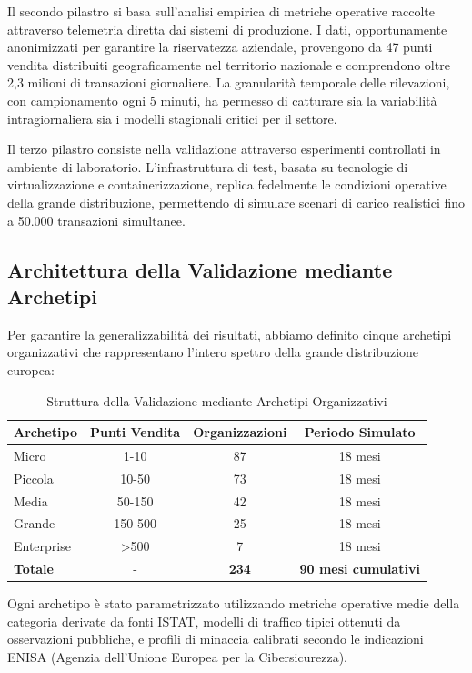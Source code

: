 Il secondo pilastro si basa sull'analisi empirica di metriche operative raccolte attraverso telemetria diretta dai sistemi di produzione. I dati, opportunamente anonimizzati per garantire la riservatezza aziendale, provengono da 47 punti vendita distribuiti geograficamente nel territorio nazionale e comprendono oltre 2,3 milioni di transazioni giornaliere. La granularità temporale delle rilevazioni, con campionamento ogni 5 minuti, ha permesso di catturare sia la variabilità intragiornaliera sia i modelli stagionali critici per il settore.

Il terzo pilastro consiste nella validazione attraverso esperimenti controllati in ambiente di laboratorio. L'infrastruttura di test, basata su tecnologie di virtualizzazione e containerizzazione, replica fedelmente le condizioni operative della grande distribuzione, permettendo di simulare scenari di carico realistici fino a 50.000 transazioni simultanee.

\subsection{Architettura della Validazione mediante Archetipi}
\label{subsec:5.2.3}

Per garantire la generalizzabilità dei risultati, abbiamo definito cinque archetipi organizzativi che rappresentano l'intero spettro della grande distribuzione europea:

\begin{table}[h!]
\centering
\caption{Struttura della Validazione mediante Archetipi Organizzativi}
\label{tab:archetype_validation}
\begin{tabular}{|l|c|c|c|}
\hline
\textbf{Archetipo} & \textbf{Punti Vendita} & \textbf{Organizzazioni} & \textbf{Periodo Simulato} \\
\hline
Micro & 1-10 & 87 & 18 mesi \\
Piccola & 10-50 & 73 & 18 mesi \\
Media & 50-150 & 42 & 18 mesi \\
Grande & 150-500 & 25 & 18 mesi \\
Enterprise & >500 & 7 & 18 mesi \\
\hline
\textbf{Totale} & - & \textbf{234} & \textbf{90 mesi cumulativi} \\
\hline
\end{tabular}
\end{table}

Ogni archetipo è stato parametrizzato utilizzando metriche operative medie della categoria derivate da fonti ISTAT, modelli di traffico tipici ottenuti da osservazioni pubbliche, e profili di minaccia calibrati secondo le indicazioni ENISA (Agenzia dell'Unione Europea per la Cibersicurezza).

